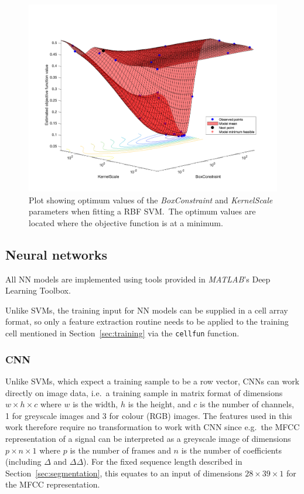 \begin{figure}[ht]
  \centering
  \includegraphics[width=\textwidth]{figures/rbf_optim.png}
  \caption{Plot showing optimum values of the \textit{BoxConstraint} and
  \textit{KernelScale} parameters when fitting a RBF SVM.\ The optimum values
are located where the objective function is at a
minimum.}\label{fig:rbf_optim}
\end{figure}

\subsection{Neural networks}

All NN models are implemented using tools provided in \textit{MATLAB}'s Deep
Learning Toolbox.

Unlike SVMs, the training input for NN models can be supplied in a cell array
format, so only a feature extraction routine needs to be applied to the training
cell mentioned in Section~\ref{sec:training} via the \texttt{cellfun} function.

\subsubsection{CNN}\label{sssec:method:cnn}

Unlike SVMs, which expect a training sample to be a row vector, CNNs can work
directly on image data, i.e.\ a training sample in matrix format of dimensions
$w \times h \times c$ where $w$ is the width, $h$ is the height, and $c$ is the
number of channels, 1 for greyscale images and 3 for colour (RGB) images. The
features used in this work therefore require no transformation to work with CNN
since e.g.\ the MFCC representation of a signal can be interpreted as a
greyscale image of dimensions $p \times n \times 1$ where $p$ is the number of
frames and $n$ is the number of coefficients (including $\Delta$ and
$\Delta\Delta$). For the fixed sequence length described in
Section~\ref{sec:segmentation}, this equates to an input of dimensions $28
\times 39 \times 1$ for the MFCC representation.

